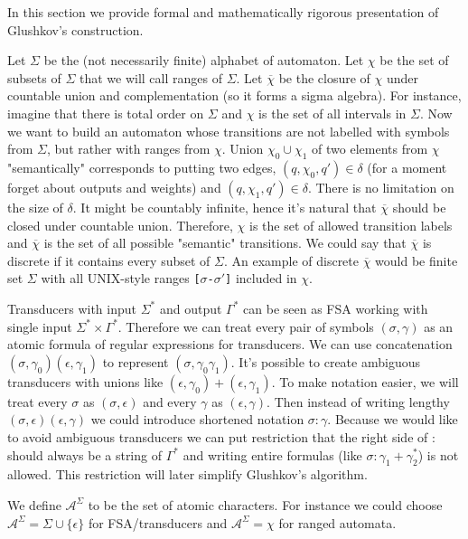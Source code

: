 In this section we provide formal and mathematically rigorous presentation of Glushkov's construction.

Let $\Sigma$ be the (not necessarily finite) alphabet of automaton. Let $\chi$ be the set of subsets of $\Sigma$ that we will call ranges of $\Sigma$. Let  $\overline{\chi}$ be  the closure of $\chi$ under countable union and complementation (so it forms a sigma algebra). For instance, imagine that there is total order on $\Sigma$ and  $\chi$ is the set of all intervals in $\Sigma$. Now we want to build an automaton whose transitions are not labelled with symbols from $\Sigma$, but rather with ranges from $\chi$. Union $\chi_0\cup\chi_1$ of two elements from $\chi$ "semantically" corresponds to putting two edges, $(q,\chi_0,q')\in\delta$ (for a moment forget about outputs and weights) and $(q,\chi_1,q')\in\delta$. There is no limitation on the size of $\delta$. It might be countably infinite, hence it's natural that $\overline{\chi}$ should be closed under countable union. Therefore, $\chi$ is the set of allowed transition labels and $\overline{\chi}$ is the set of all possible "semantic" transitions. We could say that $\overline{\chi}$ is discrete if it contains every subset of $\Sigma$. An example of discrete $\overline{\chi}$ would be finite set $\Sigma$ with all UNIX-style ranges \texttt{[$\sigma$-$\sigma'$]} included in $\chi$. 

Transducers with input $\Sigma^*$ and output $\Gamma^*$ can be seen as FSA working with single input $\Sigma^* \times \Gamma^*$. Therefore we can treat every pair of symbols $(\sigma,\gamma)$ as an atomic formula of regular expressions for transducers. We can use concatenation $(\sigma,\gamma_0)(\epsilon,\gamma_1)$ to represent $(\sigma,\gamma_0\gamma_1)$. It's possible to create ambiguous transducers with unions like  $(\epsilon,\gamma_0)+(\epsilon,\gamma_1)$.  To make notation easier, we will treat every $\sigma$ as $(\sigma,\epsilon)$ and every $\gamma$ as $(\epsilon,\gamma)$. Then instead of writing lengthy $(\sigma,\epsilon)(\epsilon,\gamma)$ we could introduce shortened notation $\sigma:\gamma$. Because we would like to avoid ambiguous transducers we can put restriction that the right side of $:$ should always be a string of $\Gamma^*$ and writing entire formulas (like $\sigma:\gamma_1+\gamma_2^*$) is not allowed. This restriction will later simplify Glushkov's algorithm. 

We define $\mathcal{A}^\Sigma$ to be the set of atomic characters. For instance we could choose $\mathcal{A}^\Sigma=\Sigma\cup\{\epsilon\}$ for FSA/transducers and $\mathcal{A}^\Sigma=\chi$ for ranged automata. 

